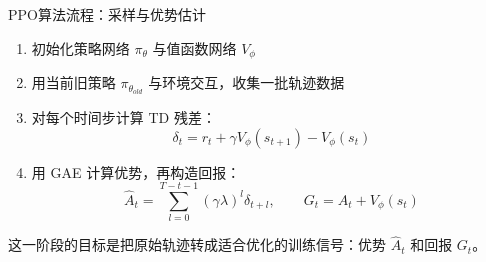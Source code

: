 \documentclass{beamer}
\begin{document}
\begin{frame}{PPO算法流程：采样与优势估计}
    \begin{enumerate}
        \item 初始化策略网络 $\pi_\theta$ 与值函数网络 $V_\phi$
        \item 用当前旧策略 $\pi_{\theta_{old}}$ 与环境交互，收集一批轨迹数据
        \item 对每个时间步计算 TD 残差：
        \[
        \delta_t = r_t + \gamma V_\phi(s_{t+1}) - V_\phi(s_t)
        \]
        \item 用 GAE 计算优势，再构造回报：
        \[
        \hat{A}_t = \sum_{l=0}^{T-t-1}(\gamma \lambda)^l \delta_{t+l}, \qquad
        G_t = \hat{A}_t + V_\phi(s_t)
        \]
    \end{enumerate}

    \vspace{0.2cm}
    {\small 这一阶段的目标是把原始轨迹转成适合优化的训练信号：优势 $\hat{A}_t$ 和回报 $G_t$。}
\end{frame}
\end{document}

